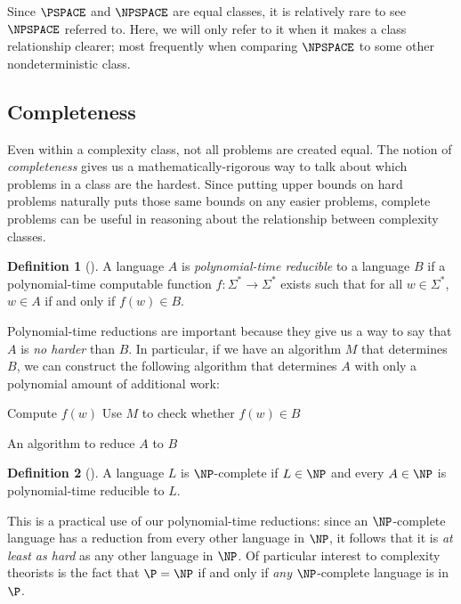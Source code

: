 \documentclass[english,12pt]{reedthesis}
\theoremstyle{plain}
\theoremstyle{definition}
\newtheorem{defn}[defn]{Definition}
\theoremstyle{remark}
\begin{document}
Since $\PSPACE$ and $\NPSPACE$ are equal classes, it is relatively rare to see
$\NPSPACE$ referred to. Here, we will only refer to it when it makes a class
relationship clearer; most frequently when comparing $\NPSPACE$ to some other
nondeterministic class.

\subsection{Completeness}

Even within a complexity class, not all problems are created equal. The notion
of \emph{completeness} gives us a mathematically-rigorous way to talk about
which problems in a class are the hardest. Since putting upper bounds on hard
problems naturally puts those same bounds on any easier problems, complete
problems can be useful in reasoning about the relationship between complexity
classes.

\begin{defn}[{\cite[Def.\ 7.29]{Sip97}}]\label{def:p-reduction}
  A language $A$ is \emph{polynomial-time reducible} to a language $B$ if a
  polynomial-time computable function $f\colon \Sigma^{*} \rightarrow \Sigma^{*}$ exists
  such that for all $w \in \Sigma^{*}$, $w \in A$ if and only if $f(w) \in B$.
\end{defn}

Polynomial-time reductions are important because they give us a way to say that
$A$ is \emph{no harder} than $B$. In particular, if we have an algorithm $M$
that determines $B$, we can construct the following algorithm that determines
$A$ with only a polynomial amount of additional work:

\begin{algorithm}[H]
  Compute $f(w)$\;
  Use $M$ to check whether $f(w) \in B$\;
  \;
  \caption{An algorithm to reduce $A$ to $B$}
\end{algorithm}

\begin{defn}[{\cite[Def.\ 7.34]{Sip97}}]\label{def:np-complete}
  A language $L$ is $\NP$-complete if $L \in \NP$ and every $A \in \NP$ is
  polynomial-time reducible to $L$.
\end{defn}

This is a practical use of our polynomial-time reductions: since an
$\NP$-complete language has a reduction from every other language in $\NP$, it
follows that it is \emph{at least as hard} as any other language in $\NP$. Of
particular interest to complexity theorists is the fact that $\P = \NP$ if and
only if \emph{any} $\NP$-complete language is in $\P$.
\end{document}
